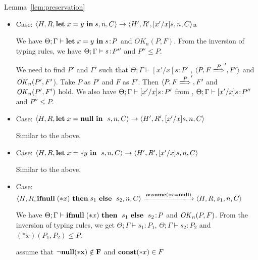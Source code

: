 \begin{pfof}{Lemma~\ref{lem:preservation}}
\begin{itemize}
  We have \(\Theta; \Gamma \vdash *x \leftarrow y : P\) and
  \(\OK_{n}(P, F)\). From the inversion of typing rules, we have \(0 \le
  P\).

  We need to find \(P'\) such that \(\Theta; \Gamma \vdash \SKIP:
  P'\), \( \langle P, F \xLongrightarrow P', F' \rangle \) and
  \(\OK_n(P', F')\). Take \(P\) as \(P'\) and \(F\) as \(F'\). Then,
  \( \langle P, F \xLongrightarrow P', F'\) and \(\OK_n(P', F')\)
  hold. We also have \(\Theta; \Gamma \vdash \SKIP: P'\) from
  , \(0 \le P\) and .

\item Case: \( \langle H, R, \mathbf{let}\; x = y\ \mathbf{in}\; s , n, C \rangle
  \rightarrow \langle H', R', [x'/x]s, n, C \rangle \)a

  We have \(\Theta; \Gamma \vdash \LET x = y \ \IN s \COL P\) and
  \(OK_{n}(P, F)\). From the inversion of typing rules, we have \(\Theta;
  \Gamma \vdash s\!:\! P''\) and \(P'' \le P\).

  We need to find \(P'\) and \(\Gamma'\) such that \(\Theta; \Gamma
  \vdash [x'/x]s : P'\) , \( \langle P, F \xLongrightarrow P', F'
  \rangle\) and \(\mathit{OK}_n(P', F'\)). Take \(P\) as \(P'\) and \(F\) as
  \(F'\). Then \( \langle P,F \xLongrightarrow P', F'\) and
  \(\OK_n(P', F')\) hold.  We also have \(\Theta; \Gamma \vdash
       [x'/x]s\!:\! P'\) from , \(\Theta; \Gamma \vdash
       [x'/x]s\!:\! P''\) and \( P'' \le P\).

\item Case: \( \langle H, R, \LET x = \NULL \ \IN \ s, n, C\rangle
  \rightarrow \langle H', R', [x'/x]s, n, C \rangle \)

  Similar to the above.

\item Case: \( \langle H, R, \mathbf{let}\; x = *y \ \mathbf{in}\; \ s, n, C\rangle
  \rightarrow \langle H', R', [x'/x]s, n, C\rangle \)

  Similar to the above.

\item Case: \(\langle H, R, \IFNULL \Sirx \ \THEN s_{1} \ \ELSE
  \ s_{2}, n, C\rangle \xlongrightarrow{\sassx} \langle H, R, s_{1}, n, C \rangle\)

  We have \(\Theta; \Gamma \vdash \mathbf{ifnull}\; (*x) \ \mathbf{then}\; \ s_{1}
  \ \mathbf{else}\; \ s_{2}\!:\! P\) and \(\OK_{n}(P, F)\). From the inversion of
  typing rules, we get \(\Theta; \Gamma \vdash s_1 : P_1\),
  \(\Theta; \Gamma \vdash s_2 : P_2\) and \( (*x)(P_1,P_2) \le
  P\). 

  \subitem assume that \(\neg\bf{null}(*x) \notin F\) and \(\mathbf{const}(*x) \in F \)


\end{itemize}
\end{pfof}
